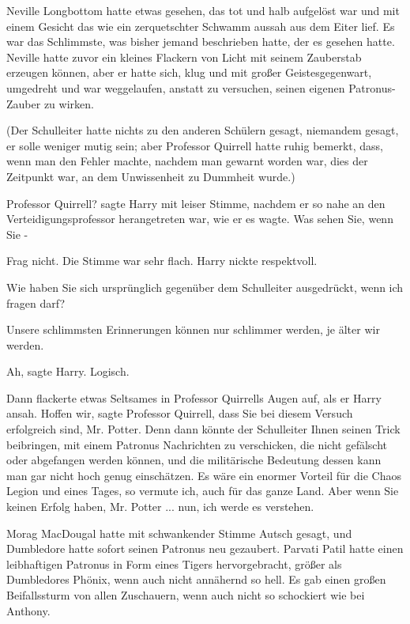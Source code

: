 Neville Longbottom hatte etwas gesehen, das tot und halb aufgelöst war und mit
einem Gesicht das wie ein zerquetschter Schwamm aussah aus dem Eiter lief. Es
war das Schlimmste, was bisher jemand beschrieben hatte, der es gesehen hatte.
Neville hatte zuvor ein kleines Flackern von Licht mit seinem Zauberstab
erzeugen können, aber er hatte sich, klug und mit großer Geistesgegenwart,
umgedreht und war weggelaufen, anstatt zu versuchen, seinen eigenen
Patronus-Zauber zu wirken.

(Der Schulleiter hatte nichts zu den anderen Schülern gesagt, niemandem gesagt,
er solle weniger mutig sein; aber Professor Quirrell hatte ruhig bemerkt, dass,
wenn man den Fehler machte, nachdem man gewarnt worden war, dies der Zeitpunkt
war, an dem Unwissenheit zu Dummheit wurde.)

\glqq{}Professor Quirrell?\grqq{} sagte Harry mit leiser Stimme, nachdem er so
nahe an den Verteidigungsprofessor herangetreten war, wie er es wagte. \glqq{}Was
sehen Sie, wenn Sie -\grqq{}

\glqq{}Frag nicht.\grqq{} Die Stimme war sehr flach. Harry nickte respektvoll.

\glqq{}Wie haben Sie sich ursprünglich gegenüber dem Schulleiter ausgedrückt,
wenn ich fragen darf?\grqq{}

\glqq{}Unsere schlimmsten Erinnerungen können nur schlimmer werden, je älter wir
werden.\grqq{}

\glqq{}Ah\grqq{}, sagte Harry. \glqq{}Logisch.\grqq{}

Dann flackerte etwas Seltsames in Professor Quirrells Augen auf, als er Harry
ansah. \glqq{}Hoffen wir\grqq{}, sagte Professor Quirrell, \glqq{}dass Sie bei
diesem Versuch erfolgreich sind, Mr. Potter. Denn dann könnte der Schulleiter
Ihnen seinen Trick beibringen, mit einem Patronus Nachrichten zu verschicken,
die nicht gefälscht oder abgefangen werden können, und die militärische
Bedeutung dessen kann man gar nicht hoch genug einschätzen. Es wäre ein enormer
Vorteil für die Chaos Legion und eines Tages, so vermute ich, auch für das ganze
Land. Aber wenn Sie keinen Erfolg haben, Mr. Potter ... nun, ich werde es
verstehen.\grqq{}

Morag MacDougal hatte mit schwankender Stimme \glqq{}Autsch\grqq{} gesagt, und
Dumbledore hatte sofort seinen Patronus neu gezaubert. Parvati Patil hatte einen
leibhaftigen Patronus in Form eines Tigers hervorgebracht, größer als
Dumbledores Phönix, wenn auch nicht annähernd so hell. Es gab einen großen
Beifallssturm von allen Zuschauern, wenn auch nicht so schockiert wie bei
Anthony.


